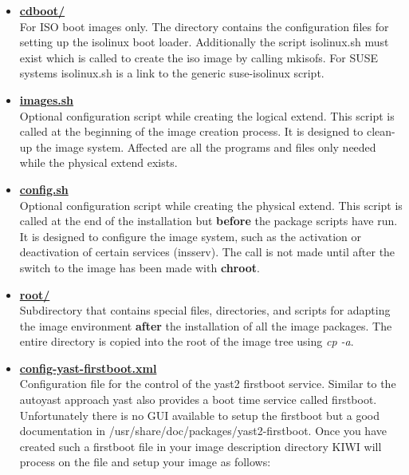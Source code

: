 \begin{itemize}
\item \textbf{\underline{cdboot/}}\\
      For ISO boot images only. The directory contains the configuration
      files for setting up the isolinux boot loader. Additionally the
      script isolinux.sh must exist which is called to create the
      iso image by calling mkisofs. For SUSE systems isolinux.sh is
      a link to the generic suse-isolinux script. 

\item \textbf{\underline{images.sh}}\\
      Optional configuration script while creating the logical extend.
      This script is called at the beginning of the image creation process.
      It is designed to clean-up the image system. Affected are all the
      programs and files only needed while the physical extend exists.

\item \textbf{\underline{config.sh}}\\
      Optional configuration script while creating the physical extend. This
      script is called at the end of the installation but \textbf{before}
      the package scripts have run. It is designed to configure the image
      system, such as the activation or deactivation of certain services
      (insserv). The call is not made until after the switch to the image
      has been made with \textbf{chroot}.

\item \textbf{\underline{root/}}\\
      Subdirectory that contains special files, directories, and scripts for
      adapting the image environment \textbf{after} the installation of all the
      image packages. The entire directory is copied into the root of the
      image tree using \textit{cp -a}.

\item \textbf{\underline{config-yast-firstboot.xml}}\\
      Configuration file for the control of the yast2 firstboot service.
      Similar to the autoyast approach yast also provides a boot time
      service called firstboot. Unfortunately there is no GUI available
      to setup the firstboot but a good documentation in
      /usr/share/doc/packages/yast2-firstboot. Once you have 
      created such a firstboot file in your image description directory KIWI
      will process on the file and setup your image as follows:


\end{itemize}
